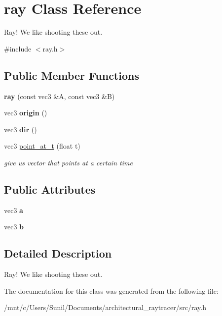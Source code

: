 \hypertarget{classray}{}\section{ray Class Reference}
\label{classray}


Ray! We like shooting these out.  




{\ttfamily \#include $<$ray.\+h$>$}

\subsection*{Public Member Functions}
\begin{DoxyCompactItemize}
\item 
\mbox{\label{classray_a6f7e85ce93eceba80008f45b625369fc}} 
{\bfseries ray} (const vec3 \&A, const vec3 \&B)
\item 
\mbox{\label{classray_a9a70fc19772871d9da033948c2c608ba}} 
vec3 {\bfseries origin} ()
\item 
\mbox{\label{classray_a1cca7288646b1f534f7a191fa16a8dc6}} 
vec3 {\bfseries dir} ()
\item 
\mbox{\label{classray_a8937338e8d3b45dd503e1e825a57ffe0}} 
vec3 \hyperlink{classray_a8937338e8d3b45dd503e1e825a57ffe0}{point\+\_\+at\+\_\+t} (float t)
\begin{DoxyCompactList}\small\item\em give us vector that points at a certain \textquotesingle{}time\textquotesingle{} \end{DoxyCompactList}\end{DoxyCompactItemize}
\subsection*{Public Attributes}
\begin{DoxyCompactItemize}
\item 
\mbox{\label{classray_ae36c071d6adc764d443c9a0c630e08c0}} 
vec3 {\bfseries a}
\item 
\mbox{\label{classray_a97e010eddb1ad0c41c054de30a980719}} 
vec3 {\bfseries b}
\end{DoxyCompactItemize}


\subsection{Detailed Description}
Ray! We like shooting these out. 

The documentation for this class was generated from the following file\+:\begin{DoxyCompactItemize}
\item 
/mnt/c/\+Users/\+Sunil/\+Documents/architectural\+\_\+raytracer/src/ray.\+h\end{DoxyCompactItemize}

